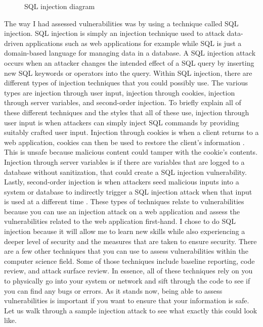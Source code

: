 \begin{figure}
\centering
{}
\caption{SQL injection diagram}
\label{fig:sql injection diagram}
\end{figure}

The way I had assessed vulnerabilities was by using a technique called SQL injection. SQL injection is simply an injection technique used to attack data-driven applications such as web applications for example while SQL is just a domain-based language for managing data in a database. A SQL injection attack occurs when an attacker changes the intended effect of a SQL query by inserting new SQL keywords or operators into the query. Within SQL injection, there are different types of injection techniques that you could possibly use. The various types are injection through user input, injection through cookies, injection through server variables, and second-order injection. To briefly explain all of these different techniques and the styles that all of these use, injection through user input is when attackers can simply inject SQL commands by providing suitably crafted user input.
Injection through cookies is when a client returns to a web application, cookies can then be used to restore the client's information \cite{W3schools}.
This is unsafe because malicious content could tamper with the cookie's contents. Injection through server variables is if there are variables that are logged to a database without sanitization, that could create a SQL injection vulnerability. Lastly, second-order injection is when attackers seed malicious inputs into a system or database to indirectly trigger a SQL injection attack when that input is used at a different time \cite{halfond2006classification}.
These types of techniques relate to vulnerabilities because you can use an injection attack on a web application and assess the vulnerabilities related to the web application first-hand. I chose to do SQL injection because it will allow me to learn new skills while also experiencing a deeper level of security and the measures that are taken to ensure security. There are a few other techniques that you can use to assess vulnerabilities within the computer science field. Some of those techniques include baseline reporting, code review, and attack surface review. In essence, all of these techniques rely on you to physically go into your system or network and sift through the code to see if you can find any bugs or errors. As it stands now, being able to assess vulnerabilities is important if you want to ensure that your information is safe. Let us walk through a sample injection attack to see what exactly this could look like.


